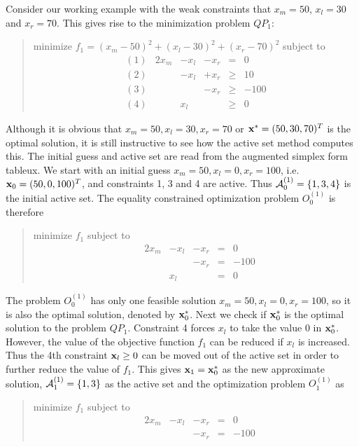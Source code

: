 \documentclass{article}
\begin{document}
%
%

Consider our working example with the weak constraints that
$x_m=50$, $x_l=30$ and $x_r=70$\@. This gives rise to the
minimization problem $QP_1:$
\begin{quote}
minimize $f_1 = (x_m - 50)^2 + (x_l - 30)^2 
+ (x_r - 70)^2 $ subject to
$$
\begin{array}{rrrrcl}
(1)  & 2 x_m & -x_l & -x_r & = & 0 \\
(2)      &       & -x_l & +x_r & \geq & 10 \\
(3)      &       &      & -x_r & \geq & -100 \\
(4)      &       & x_l  &      & \geq & 0 
\end{array}
$$
\end{quote}
Although it is obvious that $x_m = 50, x_l = 30, x_r = 70 $
or $ {\bf x}^\ast = (50,30,70)^T$ is the optimal solution, it is still
instructive to see how the active set method computes this. 
The initial guess and active set are read from the augmented simplex form
tableux. We start with
an initial guess $x_m = 50, x_l = 0, x_r = 100$,
i.e.\ ${\bf x}_0=(50,0,100)^T$,
and constraints 1, 3 and 4 are active. Thus 
${\cal A}^{(1)}_0 = \{ 1,3,4 \}$ is the initial active set. The equality
constrained optimization problem $O^{(1)}_0$ is therefore
\begin{quote}
minimize $f_1$ subject to
$$
\begin{array}{rrrrrr}
          & 2x_m & -x_l & -x_r & = & 0 \\
          &      &      & -x_r & = & -100 \\
          &      & x_l  &      & = & 0
\end{array}
$$
\end{quote}
The problem $O^{(1)}_0$ has only one feasible solution $x_m = 50, x_l = 0,
x_r = 100$, so it is also the optimal solution, denoted by ${\bf x}^\ast_0$\@.
Next we check if ${\bf x}^\ast_0$ is the optimal solution to the problem
$QP_1$\@. Constraint 4 forces $x_l$ to take the value 0
in ${\bf x}^\ast_0$\@. However, the value of the
objective function $f_1$ can be reduced if $x_l$ 
is increased. 
Thus the 4th constraint ${\bf x}_l \geq 0 $ can be moved out of the active
set in order to further reduce the value of $f_1$\@. This gives
${\bf x}_1 = {\bf x}^\ast_0$ as the new approximate
solution, ${\cal A}^{(1)}_1 = \{1,3\}$ as the active set and the optimization
problem $O^{(1)}_1$ as 
\begin{quote}
minimize $f_1$ subject to
$$\begin{array}{rrrrrr} 
          & 2x_m & -x_l & -x_r & = & 0 \\
          &      &      & -x_r & = & -100
\end{array}
$$
\end{quote}
\end{document}
